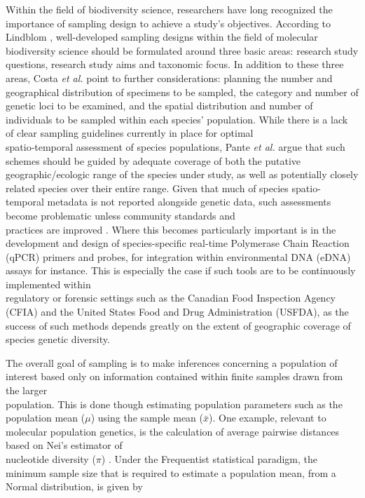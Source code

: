 Within the field of biodiversity science, researchers have long recognized the \\ importance of sampling design to achieve a study's objectives. According to Lindblom \cite{lindblom2009sample}, well-developed sampling designs within the field of molecular biodiversity science should be formulated around three basic areas: research study questions, research study aims and taxonomic focus. In addition to these three areas,  Costa \textit{et al.} \cite{costa2015conservation} point to further considerations: planning the number and geographical distribution of specimens to be sampled, the category and number of genetic loci to be examined, and the spatial distribution and number of individuals to be sampled within each species' population. While there is a lack of clear sampling guidelines currently in place for optimal \\ spatio-temporal assessment of species populations, Pante \textit{et al.} \cite{pante2015species} argue that such schemes should be guided by adequate coverage of both the putative geographic/ecologic range of the species under study, as well as potentially closely related species over their entire range. Given that much of species spatio-temporal metadata is not reported alongside genetic data, such assessments become problematic unless community standards and \\ practices are improved \cite{hanner2009data, naaum2015standards, strohm2016mitogenome}. Where this becomes particularly important is in the development and design of species-specific real-time Polymerase Chain Reaction (qPCR) primers and probes, for integration within environmental DNA (eDNA) assays for instance. This is especially the case if such tools are to be continuously implemented within 
\\ regulatory or forensic settings such as the Canadian Food Inspection Agency (CFIA) \cite{Shehata2018dna} and the United States Food and Drug Administration (USFDA), as the success of such methods depends greatly on the extent of geographic coverage of species genetic diversity.

 

The overall goal of sampling is to make inferences concerning a population of interest based only on information contained within finite samples drawn from the larger \\ population. This is done though estimating population parameters such as the population mean ($\mu$) using the sample mean ($\bar{x}$). One example, relevant to molecular population genetics, is the calculation of average pairwise distances based on Nei's estimator of \\ nucleotide diversity ($\pi$) \cite{nei1979mathematical}. Under the Frequentist statistical paradigm, the minimum sample size that is required to estimate a population mean, from a Normal distribution, is given by \cite{adcock1997sample}

